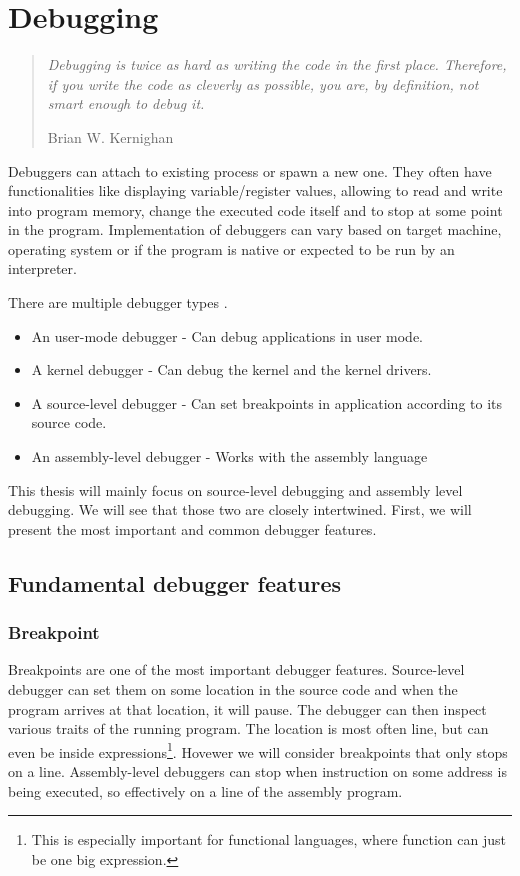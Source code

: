 \chapter{Debugging}

\begin{quote}
  \textit{Debugging is twice as hard as writing the code in the first place. Therefore, if you write the code as cleverly as possible, you are, by definition, not smart enough to debug it.}\begin{flushright}
    \tiny{Brian W. Kernighan}
  \end{flushright}
\end{quote}

Debuggers can attach to existing process or spawn a new one. They often have functionalities like displaying variable/register values, allowing to read and write into program memory, change the executed code itself and to stop at some point in the program. Implementation of debuggers can vary based on target machine, operating system or if the program is native or expected to be run by an interpreter.

There are multiple debugger types .
\begin{itemize}
    \item An user-mode debugger - Can debug applications in user mode.
    \item A kernel debugger - Can debug the kernel and the kernel drivers.
    \item A source-level debugger - Can set breakpoints in application according to its source code.
    \item An assembly-level debugger - Works with the assembly language
\end{itemize}

This thesis will mainly focus on source-level debugging and assembly level debugging. We will see that those two are closely intertwined. First, we will present the most important and common debugger features.

\section{Fundamental debugger features}
\subsection{Breakpoint}\label{breakpoint}
Breakpoints are one of the most important debugger features. Source-level debugger can set them on some location in the source code and when the program arrives at that location, it will pause. The debugger can then inspect various traits of the running program. The location is most often line, but can even be inside expressions\footnote{This is especially important for functional languages, where function can just be one big expression.}. Hovewer we will consider breakpoints that only stops on a line. Assembly-level debuggers can stop when instruction on some address is being executed, so effectively on a line of the assembly program.

